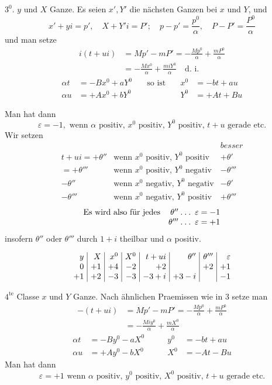 %
$3^0$. $y$ und $X$ Ganze. Es seien $x',Y'$ die nächsten Ganzen bei $x$ und $Y$, und
\[
x'+yi=p',\quad X+Y'i=P';\quad p-p'=\frac{p^0}{\alpha},\quad P-P'=\frac{P^0}{\alpha}
\]
und man setze
\[
\begin{aligned}
i(t+ui)&=Mp'-mP'=-\frac{Mp^0}{\alpha}+\frac{mP^0}{\alpha}\\
&=-\frac{Mx^0}{\alpha}+\frac{miY^0}{\alpha}\quad\text{d. i.}
\end{aligned}
\]
\[
\begin{alignedat}{3}
\alpha t&=-Bx^0+aY^0\quad&\text{so ist}\quad&x^0&=-bt+au\\
\alpha u&=+Ax^0+bY^0&&Y^0&=+At+Bu
\end{alignedat}
\]

Man hat dann
\[
\varepsilon=-1,\text{ wenn }\alpha\text{ positiv, }x^0\text{ positiv, }Y^0\text{ positiv, }t+u\text{ gerade etc.}
\]
Wir setzen
\[
\begin{array}{rll}
&&\textit{besser}\\
t+ui=+\theta''&\text{wenn }x^0\text{ positiv, }Y^0\text{ positiv}&+\theta'\\
=+\theta'''&\text{wenn }x^0\text{ positiv, }Y^0\text{ negativ}&-\theta'''\\
-\theta''&\text{wenn }x^0\text{ negativ, }Y^0\text{ negativ}&-\theta'\\
-\theta'''&\text{wenn }x^0\text{ negativ, }Y^0\text{ positiv}&+\theta'''
\end{array}
\]
\[
\begin{array}{lr}
\text{Es wird also für jedes}&\theta''\mathbin{.}\mathbin{.}\mathbin{.}\;\varepsilon=-1\\
&\theta'''\mathbin{.}\mathbin{.}\mathbin{.}\;\varepsilon=+1
\end{array}
\]
insofern $\theta''$ oder $\theta'''$ durch $1+i$ theilbar und $\alpha$ positiv.

\[
\setlength{\arraycolsep}{4pt}
\begin{array}{r|r|r|r|r|r|r|r}
y&X&x^0&X^0&t+ui&\theta''&\theta'''&\varepsilon\\
0&+1&+4&-2&+2&&+2&+1\\
+1&+2&-3&-3&-3+i&+3-i&&-1
\end{array}
\]

$4^{\mathrm{te}}$ Classe $x$ und $Y$ Ganze. Nach ähnlichen Praemissen wie in 3 setze man
\[
\begin{aligned}
-(t+ui)&=Mp'-mP'=-\frac{Mp^0}{\alpha}+\frac{mP^0}{\alpha}\\
&=-\frac{Miy^0}{\alpha}+\frac{mX^0}{\alpha}
\end{aligned}
\]
\[
\begin{alignedat}{2}
\alpha t&=-By^0-aX^0\qquad&y^0&=-bt+au\\
\alpha u&=+Ay^0-bX^0&X^0&=-At-Bu
\end{alignedat}
\]
Man hat dann
\[
\varepsilon=+1\text{ wenn }\alpha\text{ positiv, }y^0\text{ positiv, }X^0\text{ positiv, }t+u\text{ gerade etc.}
\]

